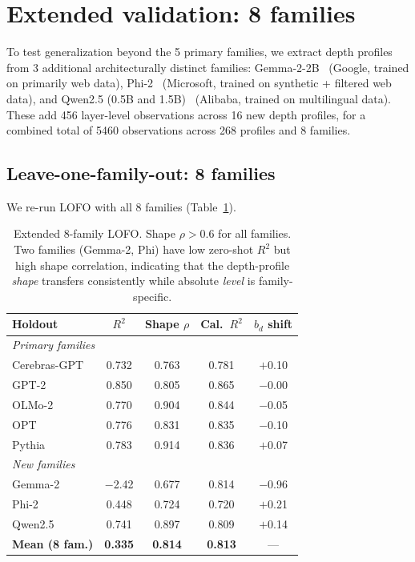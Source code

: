 \documentclass{article}
\begin{document}
\section{Extended validation: 8 families}
\label{sec:extended}

To test generalization beyond the 5 primary families, we extract depth profiles from 3 additional architecturally distinct families: Gemma-2-2B~\citep{team2024gemma2} (Google, trained on primarily web data), Phi-2~\citep{javaheripi2023phi2} (Microsoft, trained on synthetic + filtered web data), and Qwen2.5 (0.5B and 1.5B)~\citep{yang2024qwen25} (Alibaba, trained on multilingual data). These add 456 layer-level observations across 16 new depth profiles, for a combined total of 5460 observations across 268 profiles and 8 families.

\subsection{Leave-one-family-out: 8 families}

We re-run LOFO with all 8 families (Table~\ref{tab:extended_lofo}).

\begin{table}[t]
\centering
\caption{Extended 8-family LOFO. Shape $\rho > 0.6$ for all families. Two families (Gemma-2, Phi) have low zero-shot $R^2$ but high shape correlation, indicating that the depth-profile \emph{shape} transfers consistently while absolute \emph{level} is family-specific.}
\label{tab:extended_lofo}
\begin{tabular}{lcccc}
\toprule
Holdout & $R^2$ & Shape $\rho$ & Cal.\ $R^2$ & $b_d$ shift \\
\midrule
\multicolumn{5}{l}{\emph{Primary families}} \\
Cerebras-GPT & 0.732 & 0.763 & 0.781 & $+$0.10 \\
GPT-2 & 0.850 & 0.805 & 0.865 & $-$0.00 \\
OLMo-2 & 0.770 & 0.904 & 0.844 & $-$0.05 \\
OPT & 0.776 & 0.831 & 0.835 & $-$0.10 \\
Pythia & 0.783 & 0.914 & 0.836 & $+$0.07 \\
\midrule
\multicolumn{5}{l}{\emph{New families}} \\
Gemma-2 & $-$2.42 & 0.677 & 0.814 & $-$0.96 \\
Phi-2 & 0.448 & 0.724 & 0.720 & $+$0.21 \\
Qwen2.5 & 0.741 & 0.897 & 0.809 & $+$0.14 \\
\midrule
\textbf{Mean (8 fam.)} & \textbf{0.335} & \textbf{0.814} & \textbf{0.813} & --- \\
\bottomrule
\end{tabular}
\end{table}
\end{document}
